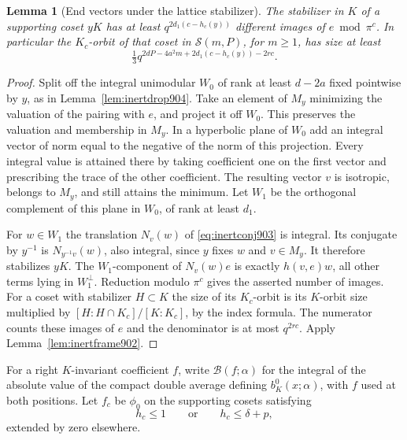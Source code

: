 \documentclass[a4paper,11pt]{article}
\newtheorem{lemma}[proposition]{Lemma}
\theoremstyle{definition}
\theoremstyle{remark}
\numberwithin{equation}{section}
\begin{document}
\begin{lemma}[End vectors under the lattice stabilizer]
\leavevmode\label{lem:inertend906}
The stabilizer in \(K\) of a supporting coset \(yK\) has at
least \(q^{2d_1(c-h_c(y))}\) different images of \(e\bmod\pi^c\).
In particular the \(K_c\)-orbit of that coset in
\(\mathcal S(m,P)\), for \(m\ge1\), has size at least
\[
          \tfrac13 q^{2dP-4a^2m+2d_1(c-h_c(y))-2rc}.
\]
\end{lemma}
\begin{proof}
Split off the integral unimodular \(W_0\) of rank at least \(d-2a\)
fixed pointwise by \(y\), as in Lemma~\ref{lem:inertdrop904}.
Take an element of \(M_y\) minimizing the valuation of the
pairing with \(e\), and project it off \(W_0\). This preserves
the valuation and membership in \(M_y\). In a hyperbolic plane
of \(W_0\) add an integral vector of norm equal to the negative
of the norm of this projection. Every integral value is attained
there by taking coefficient one on the first vector and prescribing
the trace of the other coefficient. The resulting vector \(v\)
is isotropic, belongs to \(M_y\), and still attains the minimum.
Let \(W_1\) be the orthogonal complement of this plane in
\(W_0\), of rank at least \(d_1\).

For \(w\in W_1\) the translation \(N_v(w)\) of
\eqref{eq:inertconj903} is integral. Its conjugate by \(y^{-1}\)
is \(N_{y^{-1}v}(w)\), also integral, since \(y\) fixes \(w\)
and \(v\in M_y\). It therefore stabilizes \(yK\).
The \(W_1\)-component of \(N_v(w)e\) is exactly \(h(v,e)w\),
all other terms lying in \(W_1^\perp\). Reduction modulo
\(\pi^c\) gives the asserted number of images.
For a coset with stabilizer \(H\subset K\) the size of its
\(K_c\)-orbit is its \(K\)-orbit size multiplied by
\([H:H\cap K_c]/[K:K_c]\), by the index formula. The numerator
counts these images of \(e\) and the denominator is at most
\(q^{2rc}\). Apply Lemma~\ref{lem:inertframe902}.
\end{proof}

For a right \(K\)-invariant coefficient \(f\), write
\(\mathcal B(f;\alpha)\) for the integral of the absolute
value of the compact double average defining
\(b^0_K(x;\alpha)\), with \(f\) used at both positions.
Let \(f_c\) be \(\phi_0\) on the supporting cosets satisfying
\[
                 h_c\le 1\qquad\text{or}\qquad h_c\le\delta+p ,
\]
extended by zero elsewhere.
\end{document}
